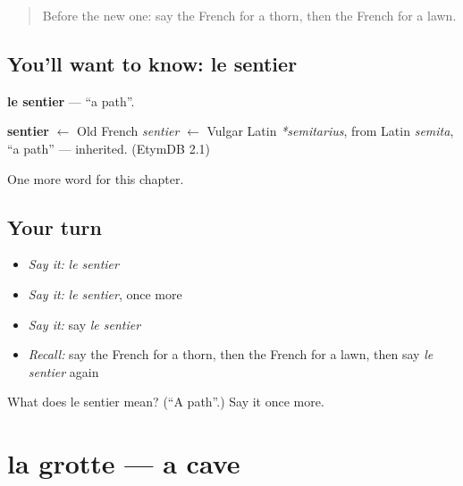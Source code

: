\label{lesson:FR-C254-sentier}



\begin{quote}
Before the new one: say the French for a thorn, then the French for a lawn.
\end{quote}

\subsection*{You'll want to know: le sentier}
\textbf{le sentier} — \textquotedblleft{}a path\textquotedblright{}.

\begin{cousinweb}
\textbf{sentier} $\leftarrow$ Old French \emph{sentier} $\leftarrow$ Vulgar Latin \emph{*semitarius}, from Latin \emph{semita}, \textquotedblleft{}a path\textquotedblright{} — inherited. (EtymDB 2.1)
\end{cousinweb}

\begin{grammarlens}[title={What you've built}]
One more word for this chapter.
\end{grammarlens}

\subsection*{Your turn}
\begin{itemize}
\raggedright
  \item \emph{Say it:} \emph{le sentier}
  \item \emph{Say it:} \emph{le sentier}, once more
  \item \emph{Say it:} say \emph{le sentier}
  \item \emph{Recall:} say the French for a thorn, then the French for a lawn, then say \emph{le sentier} again
\end{itemize}

\begin{tcolorbox}[breakable,colback=teal!4,colframe=teal!35!black,title={Before you move on}]
What does le sentier mean? (\textquotedblleft{}A path\textquotedblright{}.) Say it once more.
\end{tcolorbox}
\section[la grotte]{la grotte — a cave}

\label{lesson:FR-C254-grotte}



